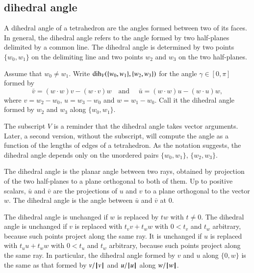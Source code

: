 \subsection{dihedral angle}

A dihedral angle of a tetrahedron are the angles formed between two of its faces. In general,
the dihedral angle refers to the angle formed by two half-planes
delimited by a common line.  The dihedral angle is determined
by two points $\{w_0,w_1\}$ on the delimiting line
and two points $w_2$ and $w_3$ on the two half-planes.

\begin{definition}\label{def:dih} Assume that $w_0\ne w_1$.
Write $\operatorname{dih}_V(\{w_0,w_1\},\{w_2,w_3\})$ for the angle $\gamma\in[0,\pi]$
formed
by 
    $$
    \bar v = (w\cdot w) v - (w\cdot v) w\quad\text{and }\quad \bar u =
            (w\cdot w) u - (w\cdot u) w,
    $$
where $v = w_2-w_0$, $u=w_3-w_0$ and $w=w_1-w_0$.  Call it
the dihedral angle formed by $w_2$ and $w_3$ along $\{w_0,w_1\}$.
\end{definition}
The subscript $V$ is a reminder 
that the dihedral angle takes vector arguments.
Later, a second version, without the subscript, will
compute the angle as a function of the lengths of edges of a 
tetrahedron.
As the notation suggests, the dihedral angle depends only
on the unordered pairs $\{w_0,w_1\}$, $\{w_2,w_3\}$.

The dihedral angle is the planar angle between two rays, obtained by projection of the two half-planes to a plane orthogonal to both of them.
Up to positive scalars, $\bar u$ and $\bar v$ are the projections of
$u$ and $v$ to a plane orthogonal to the vector $w$.  The
dihedral angle is the angle between $\bar u$ and $\bar v$ at $0$.

The dihedral angle is unchanged if $w$ is replaced by $t w$ with
$t\ne0$. The dihedral angle is unchanged if $v$ is replaced with
$t_v v + t_w w$ with $0 < t_v$ and $t_w$ arbitrary, because such points project along the same ray.  
It is unchanged if
$u$ is replaced with $t_u u + t_w w$ with $0 < t_u$ and $t_w$
arbitrary, because such points project along the same ray.  In particular, the dihedral angle formed by $v$ and
$u$ along $\{0,w\}$ is the same as that formed by $v/{{\hskip0.1em|\hskip-0.15em|\hskip0.1em}v{\hskip0.1em|\hskip-0.15em|\hskip0.1em}}$ and
$u/{{\hskip0.1em|\hskip-0.15em|\hskip0.1em}u{\hskip0.1em|\hskip-0.15em|\hskip0.1em}}$ along $w/{{\hskip0.1em|\hskip-0.15em|\hskip0.1em}w{\hskip0.1em|\hskip-0.15em|\hskip0.1em}}$.

